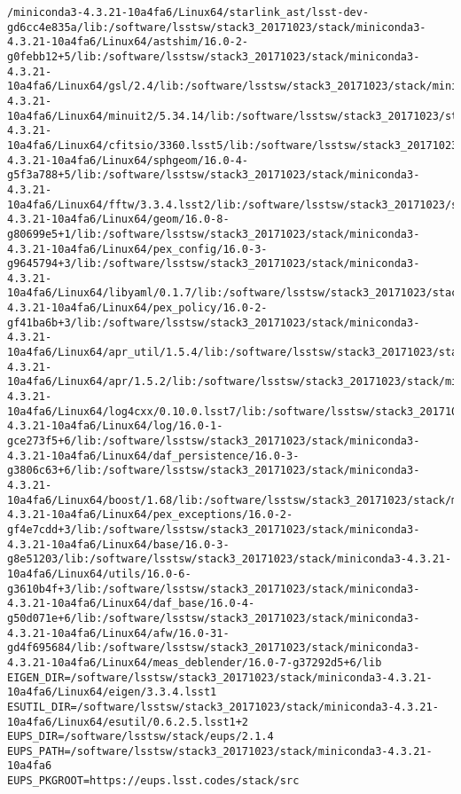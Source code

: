 \begin{verbatim}
/miniconda3-4.3.21-10a4fa6/Linux64/starlink_ast/lsst-dev-gd6cc4e835a/lib:/software/lsstsw/stack3_20171023/stack/miniconda3-4.3.21-10a4fa6/Linux64/astshim/16.0-2-g0febb12+5/lib:/software/lsstsw/stack3_20171023/stack/miniconda3-4.3.21-10a4fa6/Linux64/gsl/2.4/lib:/software/lsstsw/stack3_20171023/stack/miniconda3-4.3.21-10a4fa6/Linux64/minuit2/5.34.14/lib:/software/lsstsw/stack3_20171023/stack/miniconda3-4.3.21-10a4fa6/Linux64/cfitsio/3360.lsst5/lib:/software/lsstsw/stack3_20171023/stack/miniconda3-4.3.21-10a4fa6/Linux64/sphgeom/16.0-4-g5f3a788+5/lib:/software/lsstsw/stack3_20171023/stack/miniconda3-4.3.21-10a4fa6/Linux64/fftw/3.3.4.lsst2/lib:/software/lsstsw/stack3_20171023/stack/miniconda3-4.3.21-10a4fa6/Linux64/geom/16.0-8-g80699e5+1/lib:/software/lsstsw/stack3_20171023/stack/miniconda3-4.3.21-10a4fa6/Linux64/pex_config/16.0-3-g9645794+3/lib:/software/lsstsw/stack3_20171023/stack/miniconda3-4.3.21-10a4fa6/Linux64/libyaml/0.1.7/lib:/software/lsstsw/stack3_20171023/stack/miniconda3-4.3.21-10a4fa6/Linux64/pex_policy/16.0-2-gf41ba6b+3/lib:/software/lsstsw/stack3_20171023/stack/miniconda3-4.3.21-10a4fa6/Linux64/apr_util/1.5.4/lib:/software/lsstsw/stack3_20171023/stack/miniconda3-4.3.21-10a4fa6/Linux64/apr/1.5.2/lib:/software/lsstsw/stack3_20171023/stack/miniconda3-4.3.21-10a4fa6/Linux64/log4cxx/0.10.0.lsst7/lib:/software/lsstsw/stack3_20171023/stack/miniconda3-4.3.21-10a4fa6/Linux64/log/16.0-1-gce273f5+6/lib:/software/lsstsw/stack3_20171023/stack/miniconda3-4.3.21-10a4fa6/Linux64/daf_persistence/16.0-3-g3806c63+6/lib:/software/lsstsw/stack3_20171023/stack/miniconda3-4.3.21-10a4fa6/Linux64/boost/1.68/lib:/software/lsstsw/stack3_20171023/stack/miniconda3-4.3.21-10a4fa6/Linux64/pex_exceptions/16.0-2-gf4e7cdd+3/lib:/software/lsstsw/stack3_20171023/stack/miniconda3-4.3.21-10a4fa6/Linux64/base/16.0-3-g8e51203/lib:/software/lsstsw/stack3_20171023/stack/miniconda3-4.3.21-10a4fa6/Linux64/utils/16.0-6-g3610b4f+3/lib:/software/lsstsw/stack3_20171023/stack/miniconda3-4.3.21-10a4fa6/Linux64/daf_base/16.0-4-g50d071e+6/lib:/software/lsstsw/stack3_20171023/stack/miniconda3-4.3.21-10a4fa6/Linux64/afw/16.0-31-gd4f695684/lib:/software/lsstsw/stack3_20171023/stack/miniconda3-4.3.21-10a4fa6/Linux64/meas_deblender/16.0-7-g37292d5+6/lib
EIGEN_DIR=/software/lsstsw/stack3_20171023/stack/miniconda3-4.3.21-10a4fa6/Linux64/eigen/3.3.4.lsst1
ESUTIL_DIR=/software/lsstsw/stack3_20171023/stack/miniconda3-4.3.21-10a4fa6/Linux64/esutil/0.6.2.5.lsst1+2
EUPS_DIR=/software/lsstsw/stack/eups/2.1.4
EUPS_PATH=/software/lsstsw/stack3_20171023/stack/miniconda3-4.3.21-10a4fa6
EUPS_PKGROOT=https://eups.lsst.codes/stack/src

\end{verbatim}
